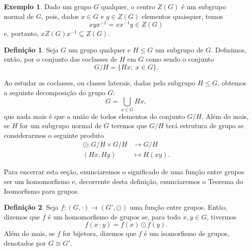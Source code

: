 \documentclass[twoside,openright,titlepage,numbers=noenddot,headinclude,  lineheaders footinclude=true,cleardoublepage=empty,
                                BCOR=5mm,paper=a4,fontsize=12pt ]{scrbook}
\theoremstyle{definition}
\newtheorem{definicao}{Definição}[chapter]
\newtheorem{exmp}{Exemplo}[section]
\begin{document}
\begin{exmp}
Dado um grupo $G$ qualquer, o centro $Z(G)$ é um subgrupo normal de $G$, pois, dados $x \in G$
e $y \in Z(G)$ elementos quaisquer, temos
\[
xyx^{-1} = xx^{-1}y \in Z(G)
\]
e, portanto, $xZ(G)x^{-1} \subseteq Z(G)$.
\end{exmp}

\begin{definicao}
Seja $G$ um grupo qualquer e $H \leq G$ um subgrupo de $G$. Definimos, então, por o conjunto das coclasses de
$H$ em $G$ como sendo o conjunto
\[
G/H = \{ Hx; \; x \in G\}.
\]
\end{definicao}

Ao estudar as coclasses, ou classes laterais, dadas pelo subgrupo $H \leq G$, obtemos a seguinte decomposição
do grupo $G$:
\[
G = \bigcup_{x \in G} Hx,
\]
que nada mais é que a união de todos elementos do conjunto $G/H$. Além do mais, se $H$ for um subgrupo normal 
de $G$ teremos que $G/H$ terá estrutura de grupo se considerarmos o seguinte produto 
\begin{align*}
\odot: G/H \times G/H &\rightarrow G/H\\
(Hx, Hy) & \mapsto H(xy).
\end{align*}

Para encerrar esta seção, enunciaremos o significado de uma função entre grupos ser um homomorfismo e,
decorrente desta definição, enunciaremos o Teorema do Isomorfismo para grupos.
\begin{definicao}
Seja $f: (G, \cdot) \rightarrow (G', \odot)$ uma função entre grupos. Então, dizemos que $f$ é um homomorfismo de grupos
se, para todo $x, y \in G$, tivermos
\[
f(x \cdot y) = f(x) \odot f(y).
\]
Além do mais, se $f$ for bijetora, dizemos que $f$ é um isomorfismo de grupos,  denotados por $G \cong G'$. 
\end{definicao}
\end{document}
